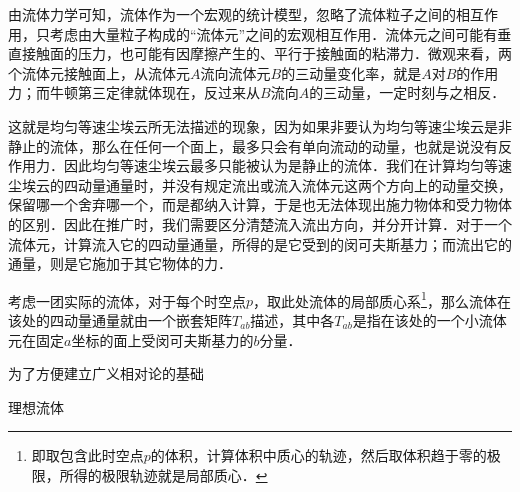 由流体力学可知，流体作为一个宏观的统计模型，忽略了流体粒子之间的相互作用，只考虑由大量粒子构成的“流体元”之间的宏观相互作用．流体元之间可能有垂直接触面的压力，也可能有因摩擦产生的、平行于接触面的粘滞力．微观来看，两个流体元接触面上，从流体元$A$流向流体元$B$的三动量变化率，就是$A$对$B$的作用力；而牛顿第三定律就体现在，反过来从$B$流向$A$的三动量，一定时刻与之相反．

这就是均匀等速尘埃云所无法描述的现象，因为如果非要认为均匀等速尘埃云是非静止的流体，那么在任何一个面上，最多只会有单向流动的动量，也就是说没有反作用力．因此均匀等速尘埃云最多只能被认为是静止的流体．我们在计算均匀等速尘埃云的四动量通量时，并没有规定流出或流入流体元这两个方向上的动量交换，保留哪一个舍弃哪一个，而是都纳入计算，于是也无法体现出施力物体和受力物体的区别．因此在推广时，我们需要区分清楚流入流出方向，并分开计算．对于一个流体元，计算流入它的四动量通量，所得的是它受到的闵可夫斯基力；而流出它的通量，则是它施加于其它物体的力．

\begin{definition}{}
考虑一团实际的流体，对于每个时空点$p$，取此处流体的局部质心系\footnote{即取包含此时空点$p$的体积，计算体积中质心的轨迹，然后取体积趋于零的极限，所得的极限轨迹就是局部质心．}，那么流体在该处的四动量通量就由一个嵌套矩阵$T_{ab}$描述，其中各$T_{ab}$是指在该处的一个小流体元在固定$a$坐标的面上受闵可夫斯基力的$b$分量．
\end{definition}


为了方便建立广义相对论的基础


\begin{definition}{理想流体}

\end{definition}













